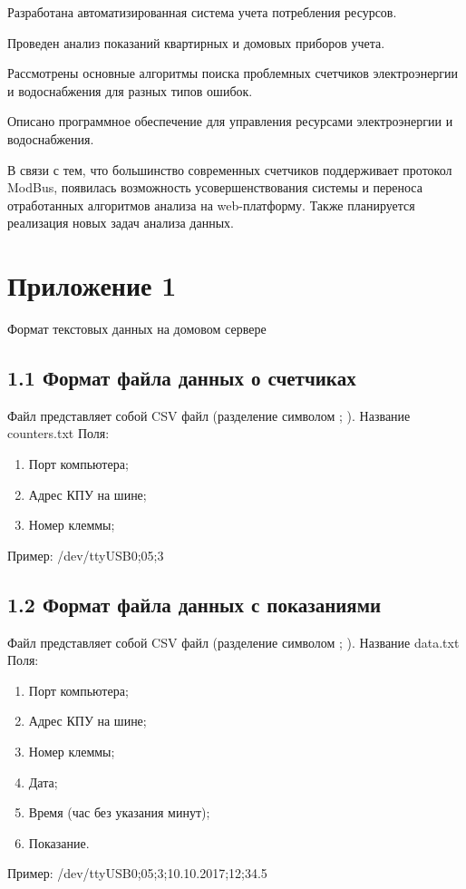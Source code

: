 \documentclass[a4paper,12pt]{article}
\begin{document}
Разработана автоматизированная система учета потребления ресурсов.

Проведен анализ показаний квартирных и домовых приборов учета.

Рассмотрены основные алгоритмы поиска проблемных счетчиков электроэнергии и водоснабжения для разных типов ошибок.

Описано программное обеспечение для управления ресурсами электроэнергии и водоснабжения.

В связи с тем, что большинство современных счетчиков поддерживает протокол ModBus, появилась возможность усовершенствования системы и переноса отработанных алгоритмов анализа на web-платформу. Также планируется реализация новых задач анализа данных.

\pagebreak

\printbibliography

\pagebreak

\section*{ \centering Приложение 1} 

\begin{center}
	Формат текстовых данных на домовом сервере
\end{center}

\subsection*{1.1 Формат файла данных о счетчиках}
Файл представляет собой CSV файл (разделение символом ; ). Название counters.txt
Поля:
\begin{enumerate}
	\item Порт компьютера;
	\item Адрес КПУ на шине;
	\item Номер клеммы;
\end{enumerate}
Пример: /dev/ttyUSB0;05;3

\subsection*{1.2 Формат файла данных с показаниями}
Файл представляет собой CSV файл (разделение символом ; ). Название data.txt
Поля:
\begin{enumerate}
	\item Порт компьютера;
	\item Адрес КПУ на шине;
	\item Номер клеммы;
	\item Дата;
	\item Время (час без указания минут);
	\item Показание.
\end{enumerate}
Пример: /dev/ttyUSB0;05;3;10.10.2017;12;34.5
\end{document}
